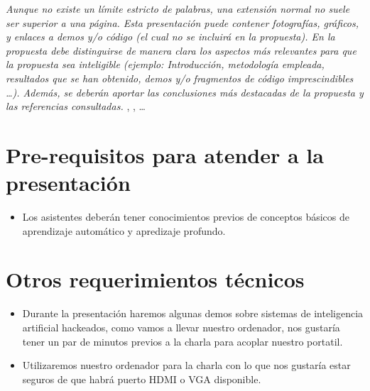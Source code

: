 \documentclass[runningheads]{llncs}
\begin{document}
\textit{Aunque no existe un l\'imite estricto de palabras, una extensi\'on normal no suele ser superior a una p\'agina. Esta presentaci\'on puede contener fotograf\'ias, gr\'aficos, y enlaces a demos y/o c\'odigo (el cual no se incluir\'a en la propuesta). En la propuesta debe distinguirse de manera clara los aspectos m\'as relevantes para que la propuesta sea inteligible (ejemplo: Introducci\'on, metodolog\'ia empleada, resultados que se han obtenido, demos y/o fragmentos de c\'odigo imprescindibles \dots). Adem\'as, se deber\'an aportar las conclusiones m\'as destacadas de la propuesta y las referencias consultadas.}
\cite{Alpher02},
\cite{Alpher03}, \cite{Alpher04} \dots


\section{Pre-requisitos para atender a la presentación}
\begin{itemize}
\item  Los asistentes deber\'an tener conocimientos previos de conceptos básicos de aprendizaje autom\'atico y apredizaje profundo. 
\end{itemize}

\section{Otros requerimientos t\'ecnicos}
\begin{itemize}
 \item Durante la presentación haremos algunas demos sobre sistemas de inteligencia artificial hackeados, como vamos a llevar nuestro ordenador, nos gustaría tener un par de minutos previos a la charla para acoplar nuestro portatil.

 \item Utilizaremos nuestro ordenador para la charla con lo que nos gustaría estar seguros de que habrá puerto HDMI o VGA disponible. 
\end{itemize}

\clearpage



\end{document}
